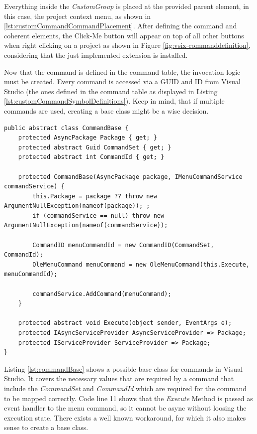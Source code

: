 Everything inside the \textit{CustomGroup} is placed at the provided parent element, in this case, the project context menu, as shown in \ref{lst:customCommandCommandPlacement}.
After defining the command and coherent elements, the Click-Me button will appear on top of all other buttons when right clicking on a project as shown in Figure \ref{fig:vsix-commanddefinition}, considering that the just implemented extension is installed.

Now that the command is defined in the command table, the invocation logic must be created. Every command is accessed via a GUID and ID from Visual Studio (the ones defined in the command table as displayed in Listing \ref{lst:customCommandSymbolDefinitions}). Keep in mind, that if multiple commands are used, creating a base class might be a wise decision.
\begin{lstlisting}[style=CSharp, caption={Possible command base}, label={lst:commandBase}]
public abstract class CommandBase {
	protected AsyncPackage Package { get; }
	protected abstract Guid CommandSet { get; }
	protected abstract int CommandId { get; }
	
	protected CommandBase(AsyncPackage package, IMenuCommandService commandService) {
		this.Package = package ?? throw new ArgumentNullException(nameof(package)); ;
		if (commandService == null) throw new ArgumentNullException(nameof(commandService));
		
		CommandID menuCommandId = new CommandID(CommandSet, CommandId);
		OleMenuCommand menuCommand = new OleMenuCommand(this.Execute, menuCommandId);
		
		commandService.AddCommand(menuCommand);
	}
	
	protected abstract void Execute(object sender, EventArgs e);
	protected IAsyncServiceProvider AsyncServiceProvider => Package;
	protected IServiceProvider ServiceProvider => Package;
}
\end{lstlisting}
Listing \ref{lst:commandBase} shows a possible base class for commands in Visual Studio. It covers the necessary values that are required by a command that include the \textit{CommandSet} and  \textit{CommandId} which are required for the command to be mapped correctly. Code line 11 shows that the \textit{Execute} Method is passed as event handler to the menu command, so it cannot be async without loosing the execution state. There exists a well known workaround, for which it also makes sense to create a base class.
